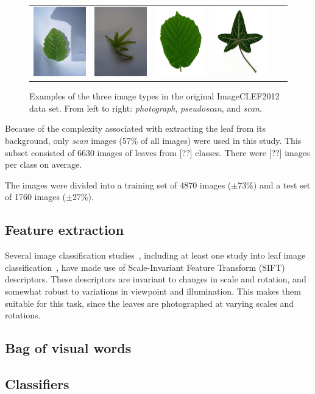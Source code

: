 \begin{figure}[htb]
{\begin{tabular}{c@{\hskip 0.1in}c|c@{\hskip 0.1in}c|c@{\hskip 0.1in}c}
\includegraphics[width = .12\textwidth]{image/5093pseudoscan.jpg} &
\includegraphics[width = .12\textwidth]{image/2655pseudoscan.jpg} &
\includegraphics[width = .12\textwidth]{image/8736scan.jpg} &
\includegraphics[width = .12\textwidth]{image/5292scan.jpg}
\end{tabular}
}
\caption{Examples of the three image types in the original ImageCLEF2012 data set. From left to right: \emph{photograph}, \emph{pseudoscan}, and \emph{scan}.}
\label{fig:imagetypes}
\end{figure}

Because of the complexity associated with extracting the leaf from its background, only \emph{scan} images (57\% of all images) were used in this study.
This subset consisted of 6630 images of leaves from [??] classes.		%
There were [??] images per class on average.	%

The images were divided into a training set of 4870 images ($\pm 73\%$) and a test set of 1760 images ($\pm 27\%$).


\subsection{Feature extraction}
Several image classification studies~\cite{Wang2015, Lowe1999}, including at least one study into leaf image classification~\cite{Wang2011}, have made use of Scale-Invariant Feature Transform (SIFT) descriptors.
These descriptors are invariant to changes in scale and rotation, and somewhat robust to variations in viewpoint and illumination.
This makes them suitable for this task, since the leaves are photographed at varying scales and rotations.


\subsection{Bag of visual words}


\subsection{Classifiers}

